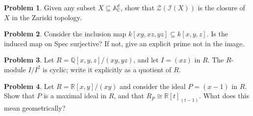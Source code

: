 \documentclass[11pt]{article}
\theoremstyle{definition}
\newtheorem{problem}{Problem}
\begin{document}
\begin{problem}
	Given any subset $X \subseteq \mathbb{A}^d_{\mathbb{C}}$, show that $\mathcal{Z}(\mathcal{I}(X))$ is the closure of $X$ in the Zariski topology.
\end{problem}


\begin{problem}
	Consider the inclusion map $k[xy,xz,yz] \subseteq k[x,y,z]$. Is the induced map on Spec surjective? If not, give an explicit prime not in the image.
\end{problem}


\begin{problem}
	Let $R = \mathbb{Q}[x,y,z]/(xy,yz)$, and let $I = (xz)$ in $R$. The $R$-module $I/I^2$ is cyclic; write it explicitly as a quotient of $R$.
\end{problem}


\begin{problem}
	Let $R = \mathbb{R}[x,y]/(xy)$ and consider the ideal $P = (x-1)$ in $R$. Show that $P$ is a maximal ideal in $R$, and that $R_P \cong \mathbb{R}[t]_{(t-1)}$. What does this mean geometrically?
\end{problem}
\end{document}
